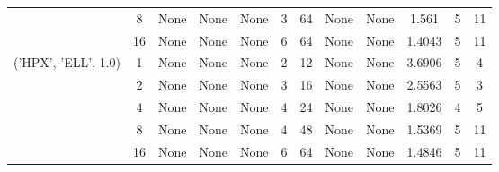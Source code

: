 \begin{tabular}{cccccccccccc}
& 8& None& None& None& 3& 64& None& None& 1.561& 5& 11\\
& 16& None& None& None& 6& 64& None& None& 1.4043& 5& 11\\
\hline
\multirow{5}{*}{('HPX', 'ELL', 1.0)}& 1& None& None& None& 2& 12& None& None& 3.6906& 5& 4\\
& 2& None& None& None& 3& 16& None& None& 2.5563& 5& 3\\
& 4& None& None& None& 4& 24& None& None& 1.8026& 4& 5\\
& 8& None& None& None& 4& 48& None& None& 1.5369& 5& 11\\
& 16& None& None& None& 6& 64& None& None& 1.4846& 5& 11\\
\hline
\end{tabular}



